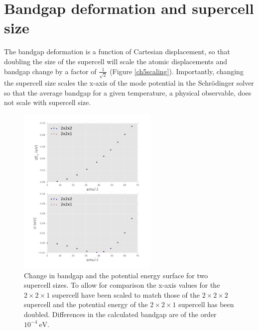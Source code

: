 \chapter{\label{app:6-SCcompare}Bandgap deformation and supercell size}

The bandgap deformation is a function of Cartesian displacement, so that doubling the size of the supercell will scale the atomic displacements and bandgap change by a factor of $\frac{1}{\sqrt{2}}$ (Figure \ref{ch5scaling}).  %
Importantly, changing the supercell size scales the x-axis of the mode potential in the Schr\"{o}dinger solver so that the average bandgap for a given temperature, a physical observable, does not scale with supercell size.

\begin{figure}[]
\includegraphics[width=0.6\textwidth]{figures/ch5/SCcompare.png} \centering 
\caption[Bandgap deformation and supercell size]{
Change in bandgap and the potential energy surface for two supercell sizes. To allow for comparison the x-axis values for the $2\times2\times1$ supercell have been scaled to match those of the $2\times2\times2$ supercell and the potential energy of the $2\times2\times1$ supercell has been doubled.  Differences in the calculated bandgap are of the order $10^{−4}\ \textrm{eV}$.
}
\end{figure}

